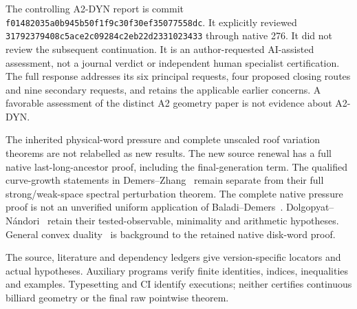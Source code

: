 \documentclass[11pt,reqno]{amsart}
\numberwithin{equation}{section}
\theoremstyle{definition}\newtheorem{definition}[theorem]{Definition}
\theoremstyle{remark}\newtheorem{remark}[theorem]{Remark}
\begin{document}
The controlling A2-DYN report is commit
\texttt{f0148203\allowbreak{}5a0b945b\allowbreak{}50f1f9c3\allowbreak{}0f30ef35\allowbreak{}077558dc}.
It explicitly reviewed
\texttt{31792379\allowbreak{}408c5ace\allowbreak{}2c09284c\allowbreak{}2eb22d23\allowbreak{}31023433}
through native 276. It did not review the subsequent continuation.
It is an author-requested AI-assisted assessment, not a journal
verdict or independent human specialist certification. The full
response addresses its six principal requests, four proposed
closing routes and nine secondary requests, and retains the
applicable earlier concerns. A favorable assessment of the distinct
A2 geometry paper is not evidence about A2-DYN.

The inherited physical-word pressure and complete unscaled roof
variation theorems are not relabelled as new results. The new
source renewal has a full native last-long-ancestor proof, including
the final-generation term. The qualified curve-growth statements
in Demers--Zhang~\cite{DZUniform} remain separate from their full
strong/weak-space spectral perturbation theorem. The complete
native pressure proof is not an unverified uniform application of
Baladi--Demers~\cite{BDPressure}. Dolgopyat--N\'andori~\cite{DNFlow}
retain their tested-observable, minimality and arithmetic
hypotheses. General convex duality~\cite{BVNotes} is background
to the retained native disk-word proof.

The source, literature and dependency ledgers give version-specific
locators and actual hypotheses. Auxiliary programs verify finite
identities, indices, inequalities and examples. Typesetting and CI
identify executions; neither certifies continuous billiard geometry
or the final raw pointwise theorem.
\end{document}
